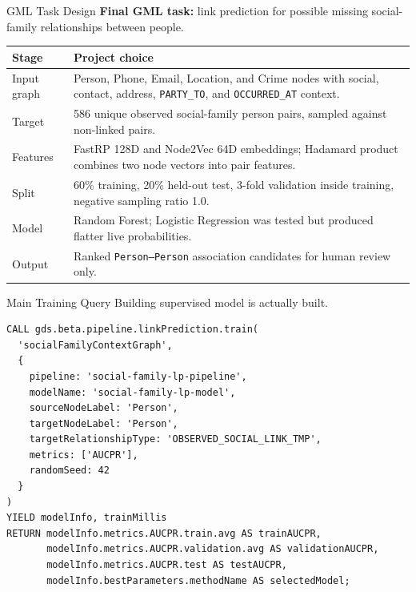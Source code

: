 ﻿\documentclass[aspectratio=169]{beamer}
\newcommand{\tinycode}[1]{\texttt{\scriptsize #1}}
\begin{document}
\begin{frame}{GML Task Design}
  \small
  \textbf{Final GML task:} link prediction for possible missing social-family relationships between people.

  \vspace{0.16cm}
  \begin{table}
    \centering
    \begin{tabular}{p{}p{}}
      \toprule
      \textbf{Stage} & \textbf{Project choice} \\
      \midrule
      Input graph & Person, Phone, Email, Location, and Crime nodes with social, contact, address, \tinycode{PARTY\_TO}, and \tinycode{OCCURRED\_AT} context. \\
      Target & 586 unique observed social-family person pairs, sampled against non-linked pairs. \\
      Features & FastRP 128D and Node2Vec 64D embeddings; Hadamard product combines two node vectors into pair features. \\
      Split & 60\% training, 20\% held-out test, 3-fold validation inside training, negative sampling ratio 1.0. \\
      Model & Random Forest; Logistic Regression was tested but produced flatter live probabilities. \\
      Output & Ranked \tinycode{Person--Person} association candidates for human review only. \\
      \bottomrule
    \end{tabular}
  \end{table}
\end{frame}

\begin{frame}[fragile]{Main Training Query}
  \small
  Building supervised model is actually built.

  \vspace{0.12cm}
  \begin{verbatim}
CALL gds.beta.pipeline.linkPrediction.train(
  'socialFamilyContextGraph',
  {
    pipeline: 'social-family-lp-pipeline',
    modelName: 'social-family-lp-model',
    sourceNodeLabel: 'Person',
    targetNodeLabel: 'Person',
    targetRelationshipType: 'OBSERVED_SOCIAL_LINK_TMP',
    metrics: ['AUCPR'],
    randomSeed: 42
  }
)
YIELD modelInfo, trainMillis
RETURN modelInfo.metrics.AUCPR.train.avg AS trainAUCPR,
       modelInfo.metrics.AUCPR.validation.avg AS validationAUCPR,
       modelInfo.metrics.AUCPR.test AS testAUCPR,
       modelInfo.bestParameters.methodName AS selectedModel;
  \end{verbatim}
\end{frame}
\end{document}
